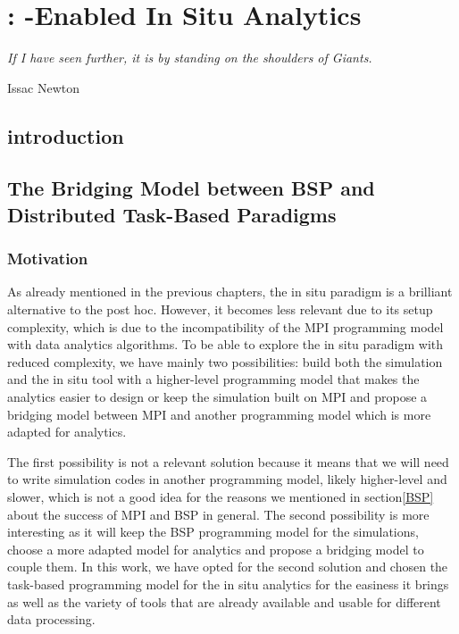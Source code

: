 \chapter{\deisa: \dask-Enabled In Situ Analytics}



\epigraph{\textit{If I have seen further, it is by standing on the shoulders of Giants.}} {Issac Newton}



\section{introduction}

\section{The Bridging Model between BSP and Distributed Task-Based Paradigms}\label{sec:btp}

\subsection{Motivation}\label{sec:btp:motivation}
As already mentioned in the previous chapters, the in situ paradigm is a brilliant alternative to the post hoc. However, it becomes less relevant due to its setup complexity, which is due to the incompatibility of the MPI programming model with data analytics algorithms. To be able to explore the in situ paradigm with reduced complexity, we have mainly two possibilities: build both the simulation and the in situ tool with a higher-level programming model that makes the analytics easier to design or keep the simulation built on MPI and propose a bridging model between MPI and another programming model which is more adapted for analytics.

The first possibility is not a relevant solution because it means that we will need to write simulation codes in another programming model, likely higher-level and slower, which is not a good idea for the reasons we mentioned in section\ref{BSP} about the success of MPI and BSP in general. 
The second possibility is more interesting as it will keep the BSP programming model for the simulations, choose a more adapted model for analytics and propose a bridging model to couple them. 
In this work, we have opted for the second solution and chosen the task-based programming model for the in situ analytics for the easiness it brings as well as the variety of tools that are already available and usable for different data processing.   

